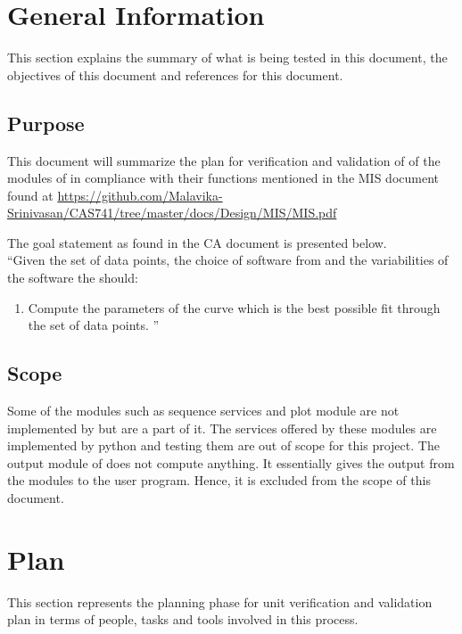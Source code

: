\documentclass[12pt, titlepage]{article}
\begin{document}
\section{General Information}

This section explains the summary of what is being tested in this document, the 
objectives of this document and references for this document. 


\subsection{Purpose}

This document will summarize the plan for verification and validation of
of the modules of \famname{} in compliance with their functions mentioned in 
the MIS document found at 
\url{https://github.com/Malavika-Srinivasan/CAS741/tree/master/docs/Design/MIS/MIS.pdf}

The goal statement as found in the CA document is presented below.\\
\noindent ``Given the set of data points, the choice of software from 
\famname{} and the variabilities of the software the \famname{} should:

\begin{enumerate}
	
	\item Compute the parameters of the curve which is the best possible fit 
	through the set of data points.	''
\end{enumerate}


\subsection{Scope}

Some of the modules such as sequence services and plot module are not 
implemented by \famname{} but are a part of it. The services offered by these 
modules are implemented by python and testing them are out of scope for this 
project.
The output module of \famname{} does not compute anything. It essentially gives 
the output from the modules to the user program. Hence, it is excluded from the 
scope of this document.

\section{Plan}

This section represents the planning phase for unit verification and validation 
plan in terms of people, tasks and tools involved in this process.
	
\end{document}
